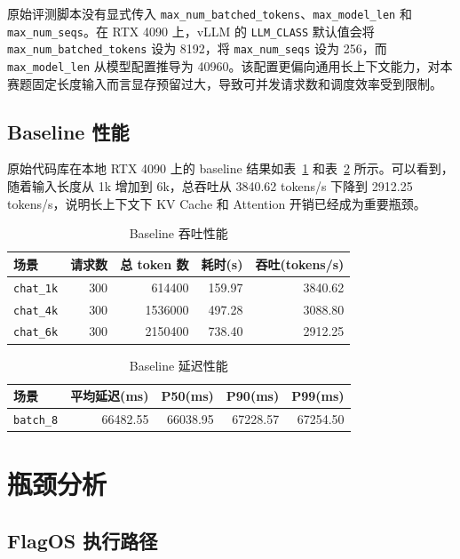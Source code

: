 \documentclass[UTF8,10.5pt]{ctexart}
\newcommand{\code}[1]{\texttt{#1}}
\begin{document}
原始评测脚本没有显式传入 \code{max\_num\_batched\_tokens}、\code{max\_model\_len} 和 \code{max\_num\_seqs}。在 RTX 4090 上，vLLM 的 \code{LLM\_CLASS} 默认值会将 \code{max\_num\_batched\_tokens} 设为 8192，将 \code{max\_num\_seqs} 设为 256，而 \code{max\_model\_len} 从模型配置推导为 40960。该配置更偏向通用长上下文能力，对本赛题固定长度输入而言显存预留过大，导致可并发请求数和调度效率受到限制。

\subsection{Baseline 性能}

原始代码库在本地 RTX 4090 上的 baseline 结果如表~\ref{tab:baseline-throughput} 和表~\ref{tab:baseline-latency} 所示。可以看到，随着输入长度从 1k 增加到 6k，总吞吐从 3840.62 tokens/s 下降到 2912.25 tokens/s，说明长上下文下 KV Cache 和 Attention 开销已经成为重要瓶颈。

\begin{table}[H]
\centering
\caption{Baseline 吞吐性能}
\label{tab:baseline-throughput}
\begin{tabular}{lrrrr}
\toprule
场景 & 请求数 & 总 token 数 & 耗时(s) & 吞吐(tokens/s) \\
\midrule
\code{chat\_1k} & 300 & 614400 & 159.97 & 3840.62 \\
\code{chat\_4k} & 300 & 1536000 & 497.28 & 3088.80 \\
\code{chat\_6k} & 300 & 2150400 & 738.40 & 2912.25 \\
\bottomrule
\end{tabular}
\end{table}

\begin{table}[H]
\centering
\caption{Baseline 延迟性能}
\label{tab:baseline-latency}
\begin{tabular}{lrrrr}
\toprule
场景 & 平均延迟(ms) & P50(ms) & P90(ms) & P99(ms) \\
\midrule
\code{batch\_8} & 66482.55 & 66038.95 & 67228.57 & 67254.50 \\
\bottomrule
\end{tabular}
\end{table}

\section{瓶颈分析}

\subsection{FlagOS 执行路径}
\end{document}

